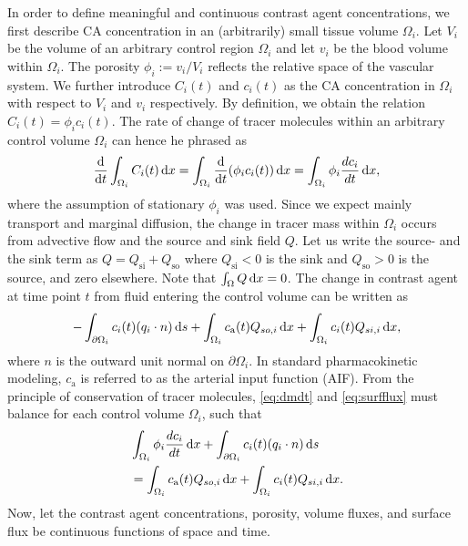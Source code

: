 \documentclass[journal,twocolumn]{IEEEtran}
\newcommand{\Qso}{Q_{\mathrm{so}}}
\newcommand{\Qsi}{Q_{\mathrm{si}}}
\newcommand{\ca}{c_\mathrm{a}}
\begin{document}
	In order to define meaningful and continuous contrast agent concentrations, we first describe CA concentration in an (arbitrarily) small tissue volume $\Omega_i$.
	Let $V_i$ be the volume of an arbitrary control region $\Omega_i$ and let $v_i$ be the blood volume within $\Omega_i$.
	The porosity $\phi_i := v_i/V_i$ reflects the relative space of the vascular system.
	We further introduce $C_i(t)$ and $c_i(t)$ as the CA concentration in $\Omega_i$ with respect to $V_i$ and $v_i$ respectively.
	By definition, we obtain the relation $C_i(t) = \phi_i  c_i(t)$.
	The rate of change of tracer molecules within an arbitrary control volume $\Omega_i$ can hence he phrased as
	\begin{equation}
		\diffop{t}\int_{\Omega_i}C_i(t) \diffint x = \int_{\Omega_i}\diffop{t}(\phi_i c_i(t)) \diffint x = \int_{\Omega_i} \phi_i \frac{d c_i}{dt}\diffint x,
		\label{eq:dmdt}
	\end{equation}	
	where the assumption of stationary $\phi_i$ was used.
	Since we expect mainly transport and marginal diffusion, the change in tracer mass within $\Omega_i$ occurs from advective flow and the source and sink field $Q$.
	Let us write the source- and the sink term as $Q = \Qsi + \Qso$ where $\Qsi < 0$ is the sink and $\Qso > 0$ is the source, and zero elsewhere. 
	Note that $\int_\Omega Q \,\mathrm{d} x = 0$. 
	The change in contrast agent at time point $t$ from fluid entering the control volume can be written as
	\begin{equation}
		-\int_{ \partial \Omega_i}c_i(t)(q_i \cdot n)\diffint s + \int_{\Omega_i}\ca(t) Q_{so,i} \diffint x + \int_{\Omega_i}c_i(t)Q_{si,i} \diffint x,
		\label{eq:surfflux}
	\end{equation}
	where $n$ is the outward unit normal on $\partial \Omega_i$.
	In standard pharmacokinetic modeling, $\ca$ is referred to as the arterial input function (AIF).
	From the principle of conservation of tracer molecules, \eqref{eq:dmdt} and \eqref{eq:surfflux} must balance for each control volume $\Omega_i$, such that
	\begin{align}
		& \int_{\Omega_i} \phi_i \frac{d c_i}{dt} \diffint x + \int_{ \partial \Omega_i}c_i(t)(q_i \cdot n) \diffint s \nonumber \\
		& = \int_{\Omega_i}\ca(t)Q_{so,i} \diffint x + \int_{\Omega_i}c_i(t) Q_{si,i} \diffint x.
		\label{eq:conteq}
	\end{align}
	Now, let the contrast agent concentrations, porosity, volume fluxes, and surface flux be continuous functions of space and time. 
\end{document}
